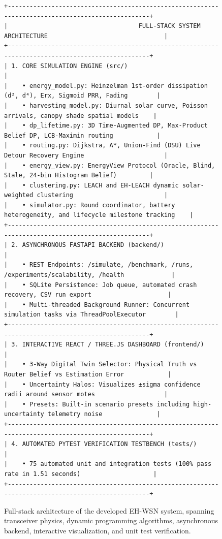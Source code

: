 \documentclass[journal]{IEEEtran}
\begin{document}
\begin{figure}[!t]
\centering
\begin{verbatim}
+--------------------------------------------------------------------------------------------------+
|                                    FULL-STACK SYSTEM ARCHITECTURE                                |
+--------------------------------------------------------------------------------------------------+
| 1. CORE SIMULATION ENGINE (src/)                                                                 |
|    • energy_model.py: Heinzelman 1st-order dissipation (d², d⁴), Erx, Sigmoid PRR, Fading        |
|    • harvesting_model.py: Diurnal solar curve, Poisson arrivals, canopy shade spatial models    |
|    • dp_lifetime.py: 3D Time-Augmented DP, Max-Product Belief DP, LCB-Maximin routing            |
|    • routing.py: Dijkstra, A*, Union-Find (DSU) Live Detour Recovery Engine                      |
|    • energy_view.py: EnergyView Protocol (Oracle, Blind, Stale, 24-bin Histogram Belief)         |
|    • clustering.py: LEACH and EH-LEACH dynamic solar-weighted clustering                         |
|    • simulator.py: Round coordinator, battery heterogeneity, and lifecycle milestone tracking    |
+--------------------------------------------------------------------------------------------------+
| 2. ASYNCHRONOUS FASTAPI BACKEND (backend/)                                                       |
|    • REST Endpoints: /simulate, /benchmark, /runs, /experiments/scalability, /health             |
|    • SQLite Persistence: Job queue, automated crash recovery, CSV run export                     |
|    • Multi-threaded Background Runner: Concurrent simulation tasks via ThreadPoolExecutor        |
+--------------------------------------------------------------------------------------------------+
| 3. INTERACTIVE REACT / THREE.JS DASHBOARD (frontend/)                                            |
|    • 3-Way Digital Twin Selector: Physical Truth vs Router Belief vs Estimation Error            |
|    • Uncertainty Halos: Visualizes ±sigma confidence radii around sensor motes                   |
|    • Presets: Built-in scenario presets including high-uncertainty telemetry noise               |
+--------------------------------------------------------------------------------------------------+
| 4. AUTOMATED PYTEST VERIFICATION TESTBENCH (tests/)                                              |
|    • 75 automated unit and integration tests (100% pass rate in 1.51 seconds)                    |
+--------------------------------------------------------------------------------------------------+
\end{verbatim}
\caption{Full-stack architecture of the developed EH-WSN system, spanning transceiver physics, dynamic programming algorithms, asynchronous backend, interactive visualization, and unit test verification.}
\label{fig:arch}
\end{figure}
\end{document}
